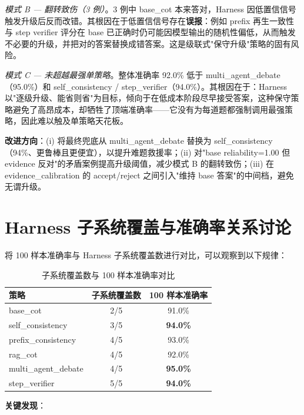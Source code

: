 \documentclass[lang=cn,a4paper,newtx]{elegantpaper}
\begin{document}
\textit{模式 B — 翻转致伤（3 例）}。3 例中 base\_cot 本来答对，Harness 因低置信信号触发升级后反而改错。其根因在于低置信信号存在\textbf{误报}：例如 prefix 再生一致性与 step verifier 评分在 base 已正确时仍可能因模型输出的随机性偏低，从而触发不必要的升级，并把对的答案替换成错答案。这是级联式"保守升级"策略的固有风险。

\textit{模式 C — 未超越最强单策略}。整体准确率 92.0\% 低于 multi\_agent\_debate（95.0\%）和 self\_consistency / step\_verifier（94.0\%）。其根因在于：Harness 以"逐级升级、能省则省"为目标，倾向于在低成本阶段尽早接受答案，这种保守策略避免了高昂成本，却牺牲了顶端准确率——它没有为每道题都强制调用最强策略，因此难以触及单策略天花板。

\textbf{改进方向}：(i) 将最终兜底从 multi\_agent\_debate 替换为 self\_consistency（94\%、更鲁棒且更便宜），以提升难题救援率；(ii) 对"base reliability=1.00 但 evidence 反对"的矛盾案例提高升级阈值，减少模式 B 的翻转致伤；(iii) 在 evidence\_calibration 的 accept/reject 之间引入"维持 base 答案"的中间档，避免无谓升级。

\section{Harness 子系统覆盖与准确率关系讨论}

将 100 样本准确率与 Harness 子系统覆盖数进行对比，可以观察到以下规律：

\begin{table}[htbp]
\centering
\caption{子系统覆盖数与 100 样本准确率对比}
\begin{tabular}{lcc}
\toprule
策略 & 子系统覆盖数 & 100 样本准确率 \\
\midrule
base\_cot & 2/5 & 91.0\% \\
self\_consistency & 3/5 & \textbf{94.0\%} \\
prefix\_consistency & 4/5 & 93.0\% \\
rag\_cot & 4/5 & 92.0\% \\
multi\_agent\_debate & 4/5 & \textbf{95.0\%} \\
step\_verifier & 5/5 & \textbf{94.0\%} \\
\bottomrule
\end{tabular}
\end{table}

\textbf{关键发现}：
\end{document}
